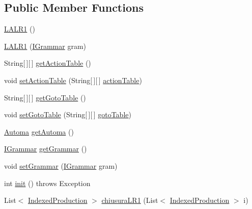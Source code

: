 \subsection*{Public Member Functions}
\begin{DoxyCompactItemize}
\item 
\hyperlink{classcontext_free_1_1parser_1_1_l_a_l_r1_a9b5c281089bfd06c95b3c61504352df2}{L\-A\-L\-R1} ()
\item 
\hyperlink{classcontext_free_1_1parser_1_1_l_a_l_r1_a38a0cedcd893b16f8207455f2287a7ad}{L\-A\-L\-R1} (\hyperlink{interfacecontext_free_1_1grammar_1_1_i_grammar}{I\-Grammar} gram)
\item 
String\mbox{[}$\,$\mbox{]}\mbox{[}$\,$\mbox{]} \hyperlink{classcontext_free_1_1parser_1_1_l_a_l_r1_a4dcd4a4ae0b77edc1dc8abffca59c80a}{get\-Action\-Table} ()
\item 
void \hyperlink{classcontext_free_1_1parser_1_1_l_a_l_r1_a4bf6b83fddf359b6b0f6df26b1e58455}{set\-Action\-Table} (String\mbox{[}$\,$\mbox{]}\mbox{[}$\,$\mbox{]} \hyperlink{classcontext_free_1_1parser_1_1_l_a_l_r1_a50a59810900d20102a28766aad917b79}{action\-Table})
\item 
String\mbox{[}$\,$\mbox{]}\mbox{[}$\,$\mbox{]} \hyperlink{classcontext_free_1_1parser_1_1_l_a_l_r1_af87607068fe2d41d8abbdb49fdeefcc0}{get\-Goto\-Table} ()
\item 
void \hyperlink{classcontext_free_1_1parser_1_1_l_a_l_r1_a002ce309af59de1951007a27d86b53b7}{set\-Goto\-Table} (String\mbox{[}$\,$\mbox{]}\mbox{[}$\,$\mbox{]} \hyperlink{classcontext_free_1_1parser_1_1_l_a_l_r1_a6f27da8ba10ef81be36845b0fffc9858}{goto\-Table})
\item 
\hyperlink{classcontext_free_1_1parser_1_1_automa}{Automa} \hyperlink{classcontext_free_1_1parser_1_1_l_a_l_r1_a27ddf376aef3ff22758c44017b37c63d}{get\-Automa} ()
\item 
\hyperlink{interfacecontext_free_1_1grammar_1_1_i_grammar}{I\-Grammar} \hyperlink{classcontext_free_1_1parser_1_1_l_a_l_r1_ab1127f78e9b15a062f6bf344f1117327}{get\-Grammar} ()
\item 
void \hyperlink{classcontext_free_1_1parser_1_1_l_a_l_r1_a66f5fb1ac9aab089d3fa937acf3f63ce}{set\-Grammar} (\hyperlink{interfacecontext_free_1_1grammar_1_1_i_grammar}{I\-Grammar} gram)
\item 
int \hyperlink{classcontext_free_1_1parser_1_1_l_a_l_r1_a7618cff4af4edfffb9a538a7cb1e79cf}{init} ()  throws Exception
\item 
List$<$ \hyperlink{classcontext_free_1_1parser_1_1_indexed_production}{Indexed\-Production} $>$ \hyperlink{classcontext_free_1_1parser_1_1_l_a_l_r1_ac711dbbc2be25d15c1a8aade7579e94e}{chiusura\-L\-R1} (List$<$ \hyperlink{classcontext_free_1_1parser_1_1_indexed_production}{Indexed\-Production} $>$ i)

\end{DoxyCompactItemize}
